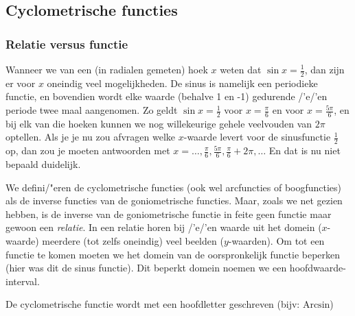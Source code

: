 


\subsection{Cyclometrische functies}

\subsubsection{Relatie versus functie}

Wanneer we van een (in radialen gemeten) hoek $x$ weten dat $\sin x=\frac{1}{2}$,
dan zijn er voor $x$ oneindig veel mogelijkheden. De sinus is namelijk
een periodieke functie, en bovendien wordt elke waarde (behalve 1
en -1) gedurende /'e/'en periode twee maal aangenomen. Zo geldt $\sin x=\frac{1}{2}$
voor $x=\frac{\pi}{6}$ en voor $x=\frac{5\pi}{6}$, en bij elk van
die hoeken kunnen we nog willekeurige gehele veelvouden van $2\pi$
optellen. Als je je nu zou afvragen welke $x$-waarde levert voor
de sinusfunctie $\frac{1}{2}$ op, dan zou je moeten antwoorden met
$x=\ldots,\frac{\pi}{6},\frac{5\pi}{6},\frac{\pi}{6}+2\pi,\ldots$
En dat is nu niet bepaald duidelijk.

\medskip{}


\noindent We defini/"eren de cyclometrische functies (ook wel arcfuncties
of boogfuncties) als de inverse functies van de goniometrische functies.
Maar, zoals we net gezien hebben, is de inverse van de goniometrische
functie in feite geen functie maar gewoon een \emph{relatie}. In een
relatie horen bij /'e/'en waarde uit het domein ($x$-waarde) meerdere
(tot zelfs oneindig) veel beelden ($y$-waarden). Om tot een functie
te komen moeten we het domein van de oorspronkelijk functie beperken
(hier was dit de sinus functie). Dit beperkt domein noemen we een
hoofdwaarde-interval.

\medskip{}


\noindent De cyclometrische functie wordt met een hoofdletter geschreven
(bijv: $\textrm{Arcsin}$)

